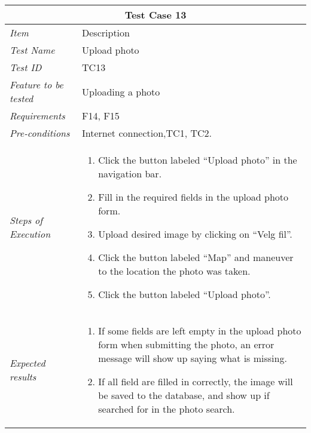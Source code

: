 \begin{minipage}{\linewidth}
\setlength{\tabcolsep}{15pt}
\centering
{}
\begin{tabular}{ |l|p{70mm}| }
	\hline
	\multicolumn{2}{|c|}{\cellcolor{gray!25} \textbf{Test Case 13}} \\
	\hline
	\it{\cellcolor{gray!25}Item} & {\cellcolor{gray!25} Description } \\
	\hline
	\it{\cellcolor{gray!25}Test Name } & Upload photo \\ \hline
	\it{\cellcolor{gray!25}Test ID} & TC13 \\ \hline
	\it{\cellcolor{gray!25}Feature to be tested} & Uploading a photo \\ \hline
	\it{\cellcolor{gray!25}Requirements} & F14, F15  \\ \hline
	\it{\cellcolor{gray!25}Pre-conditions} & Internet connection,TC1, TC2. \\ \hline
	\it{\cellcolor{gray!25}Steps of Execution} & \begin{enumerate}
	                                       \item Click the button labeled “Upload photo” in the navigation bar.
	                                       \item Fill in the required fields in the upload photo form.
	                                       \item Upload desired image by clicking on “Velg fil”.
	                                       \item Click the button labeled “Map” and maneuver to the location the photo was taken.
	                                       \item Click the button labeled “Upload photo”.
	                                     \end{enumerate} \\ \hline
	\it{\cellcolor{gray!25}Expected results} & \begin{enumerate}[label=\alph*)]
	                                       \item If some fields are left empty in the upload photo form when submitting the photo, an error message will show up saying what is missing.
	                                       \item If all field are filled in correctly, the image will be saved to the database, and show up if searched for in the photo search.
	                                     \end{enumerate} \\
	\hline
\end{tabular}
\medskip
\end{minipage}
